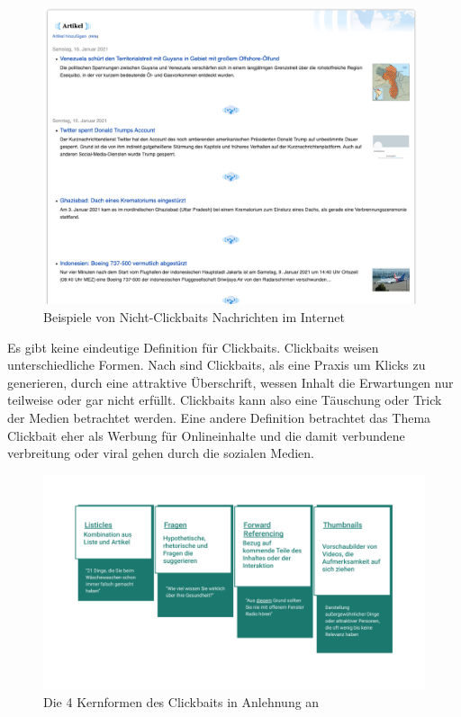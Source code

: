 \begin{figure}[H]
    \centering
    \includegraphics[width=11cm]{kapitel4/wikinews.png}
    \caption[Beispiele von Nicht-Clickbaits]{Beispiele von Nicht-Clickbaits Nachrichten im Internet}
    \label{clckbPic}
\end{figure}

Es gibt keine eindeutige Definition für Clickbaits. Clickbaits weisen unterschiedliche Formen. Nach \cite*{Biyani2016} sind Clickbaits, als eine Praxis um Klicks zu generieren, durch eine attraktive Überschrift, wessen Inhalt die Erwartungen nur teilweise oder gar nicht erfüllt. Clickbaits kann also eine Täuschung oder Trick der Medien betrachtet werden. Eine andere Definition \cite*{Potthasta} betrachtet das Thema Clickbait eher als Werbung für Onlineinhalte und die damit verbundene verbreitung oder viral gehen durch die sozialen Medien.

\begin{figure}[H]
    \centering
    \includegraphics[width=15cm]{kapitel4/clickbaits.png}
    \caption[Die Kernformen des Clickbaits]{Die 4 Kernformen des Clickbaits in Anlehnung an \cite*[71]{Hrsg2020}}
    \label{TSNE}
\end{figure}

